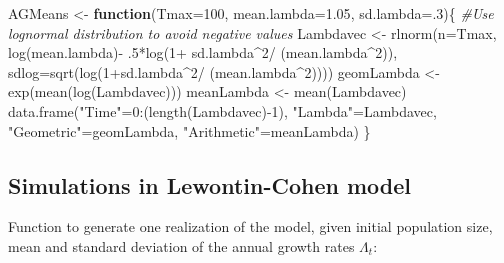 \documentclass[
]{book}
\newenvironment{Shaded}{\begin{snugshade}}{\end{snugshade}}
\newcommand{\AttributeTok}[1]{\textcolor[rgb]{0.77,0.63,0.00}{#1}}
\newcommand{\CommentTok}[1]{\textcolor[rgb]{0.56,0.35,0.01}{\textit{#1}}}
\newcommand{\ControlFlowTok}[1]{\textcolor[rgb]{0.13,0.29,0.53}{\textbf{#1}}}
\newcommand{\DecValTok}[1]{\textcolor[rgb]{0.00,0.00,0.81}{#1}}
\newcommand{\FloatTok}[1]{\textcolor[rgb]{0.00,0.00,0.81}{#1}}
\newcommand{\FunctionTok}[1]{\textcolor[rgb]{0.00,0.00,0.00}{#1}}
\newcommand{\NormalTok}[1]{#1}
\newcommand{\OtherTok}[1]{\textcolor[rgb]{0.56,0.35,0.01}{#1}}
\newcommand{\SpecialCharTok}[1]{\textcolor[rgb]{0.00,0.00,0.00}{#1}}
\newcommand{\StringTok}[1]{\textcolor[rgb]{0.31,0.60,0.02}{#1}}
\begin{document}
\begin{Shaded}
\begin{Highlighting}[]
\NormalTok{AGMeans }\OtherTok{\textless{}{-}} \ControlFlowTok{function}\NormalTok{(}\AttributeTok{Tmax=}\DecValTok{100}\NormalTok{, }\AttributeTok{mean.lambda=}\FloatTok{1.05}\NormalTok{, }\AttributeTok{sd.lambda=}\NormalTok{.}\DecValTok{3}\NormalTok{)\{}
  \CommentTok{\#Use lognormal distribution to avoid negative values}
\NormalTok{  Lambdavec }\OtherTok{\textless{}{-}} \FunctionTok{rlnorm}\NormalTok{(}\AttributeTok{n=}\NormalTok{Tmax, }
                      \FunctionTok{log}\NormalTok{(mean.lambda)}\SpecialCharTok{{-}}
\NormalTok{                        .}\DecValTok{5}\SpecialCharTok{*}\FunctionTok{log}\NormalTok{(}\DecValTok{1}\SpecialCharTok{+}\NormalTok{ sd.lambda}\SpecialCharTok{\^{}}\DecValTok{2}\SpecialCharTok{/}
\NormalTok{                                 (mean.lambda}\SpecialCharTok{\^{}}\DecValTok{2}\NormalTok{)), }
                      \AttributeTok{sdlog=}\FunctionTok{sqrt}\NormalTok{(}\FunctionTok{log}\NormalTok{(}\DecValTok{1}\SpecialCharTok{+}\NormalTok{sd.lambda}\SpecialCharTok{\^{}}\DecValTok{2}\SpecialCharTok{/}
\NormalTok{                                       (mean.lambda}\SpecialCharTok{\^{}}\DecValTok{2}\NormalTok{))))}
\NormalTok{   geomLambda }\OtherTok{\textless{}{-}} \FunctionTok{exp}\NormalTok{(}\FunctionTok{mean}\NormalTok{(}\FunctionTok{log}\NormalTok{(Lambdavec)))}
\NormalTok{   meanLambda }\OtherTok{\textless{}{-}} \FunctionTok{mean}\NormalTok{(Lambdavec)}
  \FunctionTok{data.frame}\NormalTok{(}\StringTok{"Time"}\OtherTok{=}\DecValTok{0}\SpecialCharTok{:}\NormalTok{(}\FunctionTok{length}\NormalTok{(Lambdavec)}\SpecialCharTok{{-}}\DecValTok{1}\NormalTok{), }
             \StringTok{"Lambda"}\OtherTok{=}\NormalTok{Lambdavec,}
             \StringTok{"Geometric"}\OtherTok{=}\NormalTok{geomLambda, }
             \StringTok{"Arithmetic"}\OtherTok{=}\NormalTok{meanLambda)}
\NormalTok{\}}
\end{Highlighting}
\end{Shaded}

\hypertarget{simulations-in-lewontin-cohen-model}{%
\subsection{Simulations in Lewontin-Cohen model}\label{simulations-in-lewontin-cohen-model}}

Function to generate one realization of the model, given initial population size, mean and standard deviation of the annual growth rates \(\Lambda_t\):
\end{document}
